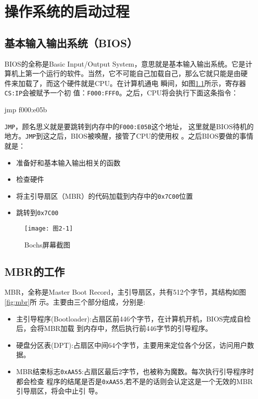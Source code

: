 \chapter{操作系统的启动过程}
\label{cha:OSboot}

\section{基本输入输出系统（BIOS）}
\label{sec:BIOS}

BIOS的全称是Basic Input/Output System，意思就是基本输入输出系统。它是计
算机上第一个运行的软件。当然，它不可能自己加载自己，那么它就只能是由硬
件来加载了，而这个硬件就是CPU\cite{zg2016}。在计算机通电
瞬间，如图\ref{fig:img2-1}所示，寄存器\texttt{CS:IP}会被赋予一个初
值：\texttt{F000:FFF0}。之后，CPU将会执行下面这条指令：
\begin{codeblock}
\begin{nasmcode}
jmp f000:e05b
\end{nasmcode}
\end{codeblock}
\texttt{JMP}，顾名思义就是要跳转到内存中的\texttt{F000:E05B}这个地址，
这里就是BIOS待机的地方。\texttt{JMP}到这之后，BIOS被唤醒，接管了CPU的使用权
。之后BIOS要做的事情就是：
\begin{itemize}
\item 准备好和基本输入输出相关的函数
\item 检查硬件
\item 将主引导扇区（MBR）的代码加载到内存中的\texttt{0x7C00}位置
\item 跳转到\texttt{0x7C00}
\end{itemize}

\begin{figure}[H]
  \centering
  \texttt{[image: 图2-1]}  
  \caption{Bochs屏幕截图}
  \label{fig:img2-1}
\end{figure}

\section{MBR的工作}
\label{sec:MBR}

MBR，全称是Master Boot Record，主引导扇区，共有512个字节，其结构如图\ref{fig:mbr}所
示。主要由三个部分组成，分别是:
\begin{itemize}
\item 主引导程序(Bootloader):占扇区前446个字节，在计算机开机，BIOS完成自检后，会将MBR加载
  到内存中，然后执行前446字节的引导程序。
\item 硬盘分区表(DPT):占扇区中间64个字节，主要用来定位各个分区，访问用户数据。
\item MBR结束标志\texttt{0xAA55}:占扇区最后2字节，也被称为魔数。每次执行引导程序时都会检查
  程序的结尾是否是\texttt{0xAA55},若不是的话则会认定这是一个无效的MBR引导扇区，将会中止引
  导。
\end{itemize}

